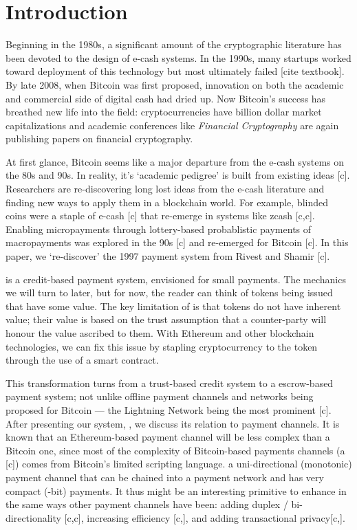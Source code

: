 

\section{Introduction}

Beginning in the 1980s, a significant amount of the cryptographic literature has been devoted to the design of e-cash systems. In the 1990s, many startups worked toward deployment of this technology but most ultimately failed [cite textbook]. By late 2008, when Bitcoin was first proposed, innovation on both the academic and commercial side of digital cash had dried up. Now Bitcoin's success has breathed new life into the field: cryptocurrencies have billion dollar market capitalizations and academic conferences like \textit{Financial Cryptography} are again publishing papers on financial cryptography. 

At first glance, Bitcoin seems like a major departure from the e-cash systems on the 80s and 90s. In reality, it's `academic pedigree' is built from existing ideas [c]. Researchers are re-discovering long lost ideas from the e-cash literature and finding new ways to apply them in a blockchain world. For example, blinded coins were a staple of e-cash [c] that re-emerge in systems like zcash [c,c]. Enabling micropayments through lottery-based probablistic payments of macropayments    was explored in the 90s [c] and re-emerged for Bitcoin [c]. In this paper, we `re-discover' the 1997 payment system \pw from Rivest and Shamir [c]. 

\pw is a credit-based payment system, envisioned for small payments. The mechanics we will turn to later, but for now, the reader can think of tokens being issued that have some value. The key limitation of \pw is that tokens do not have inherent value; their value is based on the trust assumption that a counter-party will honour the value ascribed to them. With Ethereum and other blockchain technologies, we can fix this issue by stapling cryptocurrency to the token through the use of a smart contract. 

This transformation turns \pw from a trust-based credit system to a escrow-based payment system; not unlike offline payment channels and networks being proposed for Bitcoin --- the Lightning Network being the most prominent [c]. After presenting our system, \ew, we discuss its relation to payment channels. It is known that an Ethereum-based payment channel will be less complex than a Bitcoin one, since most of the complexity of Bitcoin-based payments channels (\eg a [c]) comes from Bitcoin's limited scripting language. \ew a uni-directional (monotonic) payment channel that can be chained into a payment network and has very compact (-bit) payments. It thus might be an interesting primitive to enhance in the same ways other payment channels have been: adding duplex / bi-directionality [c,c], increasing efficiency [c,], and adding transactional privacy[c,].

